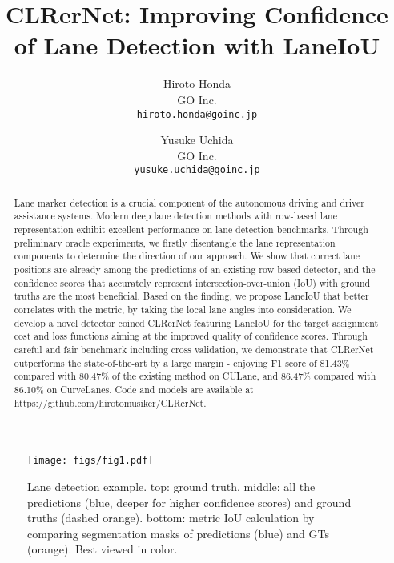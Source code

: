 \documentclass[10pt,twocolumn,letterpaper]{article}
\begin{document}
\title{CLRerNet: Improving Confidence of Lane Detection with LaneIoU}

\author{Hiroto Honda\\
GO Inc. \\
{\tt\small hiroto.honda@goinc.jp}
\and
Yusuke Uchida\\
GO Inc. \\
{\tt\small yusuke.uchida@goinc.jp}
}

\maketitle


\begin{abstract}
Lane marker detection is a crucial component of the autonomous driving and driver assistance systems.
Modern deep lane detection methods with row-based lane representation exhibit excellent performance on lane detection benchmarks.
Through preliminary oracle experiments, we firstly disentangle the lane representation components to determine the direction of our approach.
We show that correct lane positions are already among the predictions of an existing row-based detector, and the confidence scores that accurately represent intersection-over-union (IoU) with ground truths are the most beneficial.
Based on the finding, we propose LaneIoU that better correlates with the metric, by taking the local lane angles into consideration.
We develop a novel detector coined CLRerNet featuring LaneIoU for the target assignment cost and loss functions aiming at the improved quality of confidence scores.
Through careful and fair benchmark including cross validation, we demonstrate that CLRerNet outperforms the state-of-the-art by a large margin - enjoying F1 score of 81.43\% compared with 80.47\% of the existing method on CULane, and 86.47\% compared with 86.10\% on CurveLanes. 
Code and models are available at \url{https://github.com/hirotomusiker/CLRerNet}.
\end{abstract}


\begin{figure}[t]
\begin{center}
   \texttt{[image: figs/fig1.pdf]}
\end{center}
   \caption{Lane detection example. top: ground truth. middle: all the predictions (blue, deeper for higher confidence scores) and ground truths (dashed orange). bottom: metric IoU calculation by comparing segmentation masks of predictions (blue) and GTs (orange). Best viewed in color.}
\label{fig1}
\end{figure}
\end{document}
